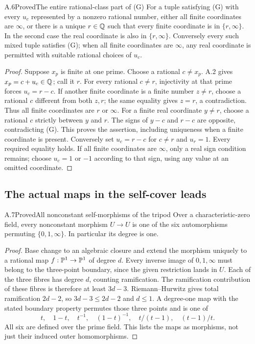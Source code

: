 \begin{statement}{A.6}{Proved}{The entire rational-class part of (G)}
For a tuple satisfying (G) with every $u_c$ represented by a nonzero
rational number, either all finite coordinates are $\infty$, or there
is a unique $r\in\mathbb Q$ such that every finite coordinate is in
$\{r,\infty\}$. In the second case the real coordinate is also in
$\{r,\infty\}$. Conversely every such mixed tuple satisfies (G);
when all finite coordinates are $\infty$, any real coordinate is
permitted with suitable rational choices of $u_c$.
\end{statement}
\begin{proof}
Suppose $x_p$ is finite at one prime. Choose a rational $c\ne x_p$.
A.2 gives $x_p=c+u_c\in\mathbb Q$; call it $r$. For every rational
$c\ne r$, injectivity at that prime forces $u_c=r-c$.
If another finite coordinate is a finite number $z\ne r$, choose
a rational $c$ different from both $z,r$; the same equality gives
$z=r$, a contradiction. Thus all finite coordinates are $r$ or
$\infty$. For a finite real coordinate $y\ne r$, choose a rational
$c$ strictly between $y$ and $r$. The signs of $y-c$ and $r-c$
are opposite, contradicting (G). This proves the assertion, including
uniqueness when a finite coordinate is present.
Conversely set $u_c=r-c$ for $c\ne r$ and $u_r=1$.
Every required equality holds. If all finite coordinates are
$\infty$, only a real sign condition remains; choose $u_c=1$ or
$-1$ according to that sign, using any value at an omitted coordinate.
\end{proof}

\subsection{The actual maps in the self-cover leads}

\begin{statement}{A.7}{Proved}{All nonconstant self-morphisms of the tripod}
Over a characteristic-zero field, every nonconstant morphism
$U\to U$ is one of the six automorphisms permuting
$\{0,1,\infty\}$. In particular its degree is one.
\end{statement}
\begin{proof}
Base change to an algebraic closure and extend the morphism uniquely
to a rational map $f:\mathbb P^1\to\mathbb P^1$ of degree $d$.
Every inverse image of $0,1,\infty$ must belong to the three-point
boundary, since the given restriction lands in $U$.
Each of the three fibres has degree $d$, counting ramification.
The ramification contribution of these fibres is therefore at least
$3d-3$. Riemann--Hurwitz gives total ramification $2d-2$,
so $3d-3\leq2d-2$ and $d\leq1$. A degree-one map with the stated
boundary property permutes those three points and is one of
\[
 t,\quad 1-t,\quad t^{-1},\quad (1-t)^{-1},
 \quad t/(t-1),\quad (t-1)/t .
\]
All six are defined over the prime field. This lists the maps as
morphisms, not just their induced outer homomorphisms.
\end{proof}

